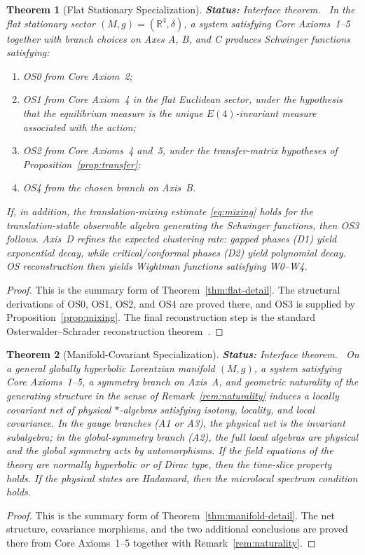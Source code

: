 \documentclass[12pt,a4paper]{article}
\theoremstyle{plain}
\newtheorem{theorem}{Theorem}[section]
\theoremstyle{definition}
\theoremstyle{remark}
\newcommand{\real}{\mathbb{R}}
\newcommand{\status}[1]{\textnormal{\textbf{Status:} #1.}\ }
\begin{document}
\begin{theorem}[Flat Stationary Specialization]\label{thm:flat}
  \status{Interface theorem}
  In the flat stationary sector $(M,g) = (\real^4, \delta)$, a system
  satisfying Core Axioms~1--5 together with branch choices on Axes A,
  B, and C produces Schwinger functions satisfying:
  \begin{enumerate}[nosep,label=(\roman*)]
  \item OS0 from Core Axiom~2;
  \item OS1 from Core Axiom~4 in the flat Euclidean sector, under the
    hypothesis that the equilibrium measure is the unique
    $E(4)$-invariant measure associated with the action;
  \item OS2 from Core Axioms~4 and~5, under the transfer-matrix
    hypotheses of Proposition~\ref{prop:transfer};
  \item OS4 from the chosen branch on Axis~B.
  \end{enumerate}
  If, in addition, the translation-mixing estimate
  \eqref{eq:mixing} holds for the translation-stable observable
  algebra generating the Schwinger functions, then OS3 follows.
  Axis~D refines the expected clustering rate: gapped phases (D1)
  yield exponential decay, while critical/conformal phases (D2) yield
  polynomial decay. OS reconstruction then yields Wightman functions
  satisfying W0--W4.
\end{theorem}
\begin{proof}
  This is the summary form of Theorem~\ref{thm:flat-detail}. The
  structural derivations of OS0, OS1, OS2, and OS4 are proved there,
  and OS3 is supplied by Proposition~\ref{prop:mixing}. The final
  reconstruction step is the standard Osterwalder--Schrader
  reconstruction theorem~\cite{OS1, OS2}.
\end{proof}

\begin{theorem}[Manifold-Covariant Specialization]\label{thm:manifold}
  \status{Interface theorem}
  On a general globally hyperbolic Lorentzian manifold $(M,g)$, a
  system satisfying Core Axioms~1--5, a symmetry branch on Axis~A,
  and geometric naturality of the generating structure in the sense of
  Remark~\ref{rem:naturality} induces a locally covariant net of
  physical $*$-algebras satisfying isotony, locality, and local
  covariance. In the gauge branches (A1 or A3), the physical net is
  the invariant subalgebra; in the global-symmetry branch (A2), the
  full local algebras are physical and the global symmetry acts by
  automorphisms. If the field equations of the theory are normally
  hyperbolic or of Dirac type, then the time-slice property holds. If
  the physical states are Hadamard, then the microlocal spectrum
  condition holds.
\end{theorem}
\begin{proof}
  This is the summary form of Theorem~\ref{thm:manifold-detail}. The
  net structure, covariance morphisms, and the two additional
  conclusions are proved there from Core Axioms~1--5 together with
  Remark~\ref{rem:naturality}.
\end{proof}
\end{document}
